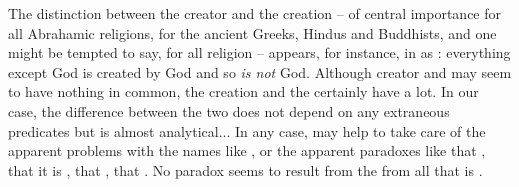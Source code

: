 {%
The distinction between the creator and the creation -- of central importance
for all Abrahamic religions, for the ancient Greeks, Hindus and Buddhists, and
one might be tempted to say, for all religion -- appears, for instance, in
\citeauthor*{Sokolowski}{} as : everything except God
is created by God and so {\em is not} God. Although creator and 
may seem to have nothing in common, the creation and the 
certainly have a lot. In our case, the difference between the two does not
depend on any extraneous predicates but is almost analytical...  In any case,
 may help to take care of the apparent problems with the names
like , or the apparent paradoxes like that , that it is , that , that .
No paradox seems to result from  the 
from all that is .}


